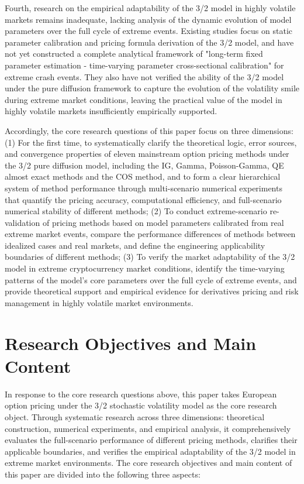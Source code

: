 Fourth, research on the empirical adaptability of the 3/2 model in highly volatile markets remains inadequate, lacking analysis of the dynamic evolution of model parameters over the full cycle of extreme events. Existing studies focus on static parameter calibration and pricing formula derivation of the 3/2 model, and have not yet constructed a complete analytical framework of "long-term fixed parameter estimation - time-varying parameter cross-sectional calibration" for extreme crash events. They also have not verified the ability of the 3/2 model under the pure diffusion framework to capture the evolution of the volatility smile during extreme market conditions, leaving the practical value of the model in highly volatile markets insufficiently empirically supported.

Accordingly, the core research questions of this paper focus on three dimensions: (1) For the first time, to systematically clarify the theoretical logic, error sources, and convergence properties of eleven mainstream option pricing methods under the 3/2 pure diffusion model, including the IG, Gamma, Poisson-Gamma, QE almost exact methods and the COS method, and to form a clear hierarchical system of method performance through multi-scenario numerical experiments that quantify the pricing accuracy, computational efficiency, and full-scenario numerical stability of different methods; (2) To conduct extreme-scenario re-validation of pricing methods based on model parameters calibrated from real extreme market events, compare the performance differences of methods between idealized cases and real markets, and define the engineering applicability boundaries of different methods; (3) To verify the market adaptability of the 3/2 model in extreme cryptocurrency market conditions, identify the time-varying patterns of the model's core parameters over the full cycle of extreme events, and provide theoretical support and empirical evidence for derivatives pricing and risk management in highly volatile market environments.

\section{Research Objectives and Main Content}
In response to the core research questions above, this paper takes European option pricing under the 3/2 stochastic volatility model as the core research object. Through systematic research across three dimensions: theoretical construction, numerical experiments, and empirical analysis, it comprehensively evaluates the full-scenario performance of different pricing methods, clarifies their applicable boundaries, and verifies the empirical adaptability of the 3/2 model in extreme market environments. The core research objectives and main content of this paper are divided into the following three aspects:

